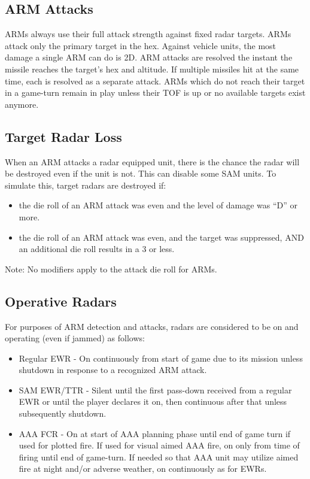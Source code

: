 \subsection{ARM Attacks} ARMs always use their full attack strength against fixed radar targets. ARMs attack only the primary target in the hex. Against vehicle units, the most damage a single ARM can do is 2D. ARM attacks are resolved the instant the missile reaches the target's hex and altitude. If multiple missiles hit at the same time, each is resolved as a separate attack. ARMs which do not reach their target in a game-turn remain in play unless their TOF is up or no available targets exist anymore.

\subsection{Target Radar Loss}  When an ARM attacks a radar equipped unit, there is the chance the radar will be destroyed even if the unit is not. This can disable some SAM units. To simulate this, target radars are destroyed if:

\begin{itemize}
\item the die roll of an ARM attack was even and the level of damage was “D” or more.

\item the die roll of an ARM attack was even, and the target was suppressed, AND an additional die roll results in a 3 or less.
\end{itemize}

Note: No modifiers apply to the attack die roll for ARMs.

\subsection{Operative Radars} For purposes of ARM detection and attacks, radars are considered to be on and operating (even if jammed) as follows:

\begin{itemize}

\item Regular EWR - On continuously from start of game due to its mission unless shutdown in response to a recognized ARM attack.

\item SAM EWR/TTR - Silent until the first pass-down received from a regular EWR or until the player declares it on, then continuous after that unless subsequently shutdown.

\item AAA FCR - On at start of AAA planning phase until end of game turn if used for plotted fire. If used for visual aimed AAA fire, on only from time of firing until end of game-turn. If needed so that AAA unit may utilize aimed fire at night and/or adverse weather, on continuously as for EWRs.

\end{itemize}

